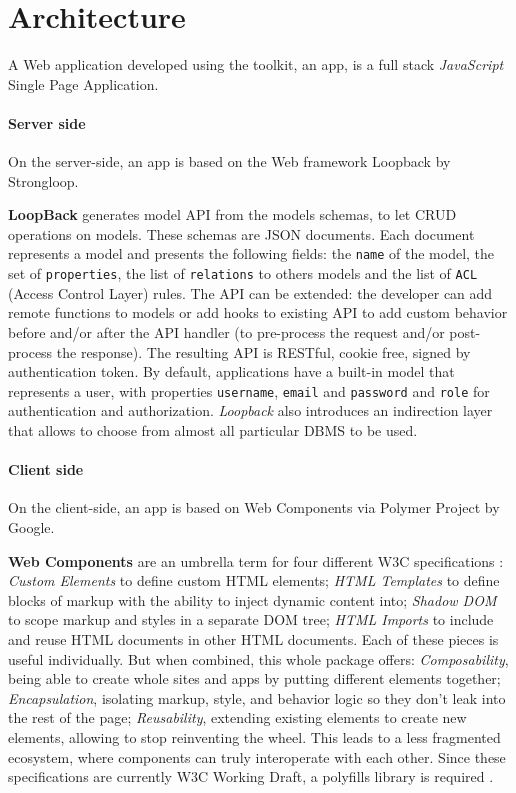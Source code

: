 \section{Architecture}\label{sec:architecture}

A Web application developed using the  toolkit, an  app, is a full stack {\em JavaScript} Single Page Application.

\paragraph{Server side}
On the server-side, an  app is based on the Web framework Loopback by Strongloop.

\textbf{LoopBack} generates model API from the models schemas, to let CRUD operations on models.
These schemas are JSON documents. Each document represents a model and presents the following fields: the \texttt{name} of the model, the set of \texttt{properties}, the list of \texttt{relations} to others models and the list of \texttt{ACL} (Access Control Layer) rules. 
The API can be extended: the developer can add remote functions to models or add hooks to existing API to add custom behavior before and/or after the API handler (to pre-process the request and/or post-process the response). 
The resulting API is RESTful, cookie free, signed by authentication token.
By default, applications have a built-in model that represents a user, with properties \texttt{username}, \texttt{email} and \texttt{password} and \texttt{role} for authentication and authorization.
{\em Loopback} also introduces an indirection layer that allows to choose from almost all particular DBMS to be used.

\paragraph{Client side}
On the client-side, an  app is based on Web Components via Polymer Project by Google.

\textbf{Web Components} are an umbrella term for four different W3C specifications \cite{w3c}:
\emph{Custom Elements} to define custom HTML elements;
\emph{HTML Templates} to define blocks of markup with the ability to inject dynamic content into;
\emph{Shadow DOM} to scope markup and styles in a separate DOM tree;
\emph{HTML Imports} to include and reuse HTML documents in other HTML documents.
Each of these pieces is useful individually. But when combined, this whole package offers:
\emph{Composability}, being able to create whole sites and apps by putting different elements together;
\emph{Encapsulation}, isolating markup, style, and behavior logic so they don't leak into the rest of the page;
\emph{Reusability}, extending existing elements to create new elements, allowing to stop reinventing the wheel.
This leads to a less fragmented ecosystem, where components can truly interoperate with each other.
Since these specifications are currently W3C Working Draft, a polyfills library is required \cite{webcomponents-polyfills}.
        
